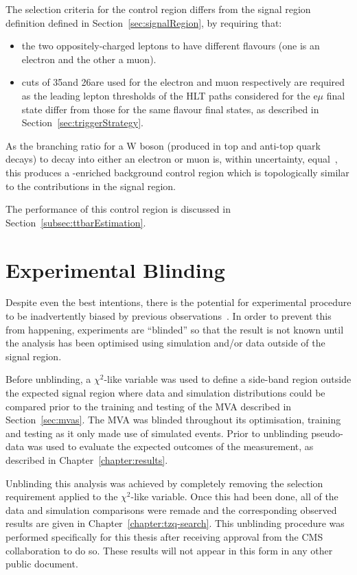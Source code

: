 The selection criteria for the \ttbar control region differs from the signal region definition defined in Section~\ref{sec:signalRegion}, by requiring that:
\begin{itemize}
\item the two oppositely-charged leptons to have different flavours (\ie one is an electron and the other a muon).
\item \pt cuts of 35\GeV and 26\GeV are used for the electron and muon respectively are required as the leading lepton \pt thresholds of the HLT paths considered for the e$\mu$ final state differ from those for the same flavour final states, as described in Section~\ref{sec:triggerStrategy}. 
\end{itemize} 

As the branching ratio for a W boson (produced in top and anti-top quark decays) to decay into either an electron or muon is, within uncertainty, equal~\cite{Tanabashi:2018oca}, this produces a \ttbar-enriched background control region which is topologically similar to the \ttbar contributions in the signal region. 

The performance of this control region is discussed in Section~\ref{subsec:ttbarEstimation}.

\section{Experimental Blinding}\label{sec:blinding}
Despite even the best intentions, there is the potential for experimental procedure to be inadvertently biased by previous observations~\cite{Roodman:2003rw}.
In order to prevent this from happening, experiments are ``blinded'' so that the result is not known until the analysis has been optimised using simulation and/or data outside of the signal region.

Before unblinding, a $\chi^{2}$-like variable was used to define a side-band region outside the expected signal region where data and simulation distributions could be compared prior to the training and testing of the MVA described in Section~\ref{sec:mvas}.
The MVA was blinded throughout its optimisation, training and testing as it only made use of simulated events.
Prior to unblinding pseudo-data was used to evaluate the expected outcomes of the measurement, as described in Chapter~\ref{chapter:results}.

Unblinding this analysis was achieved by completely removing the selection requirement applied to the $\chi^{2}$-like variable.
Once this had been done, all of the data and simulation comparisons were remade and the corresponding observed results are given in Chapter~\ref{chapter:tzq-search}.
This unblinding procedure was performed specifically for this thesis after receiving approval from the CMS collaboration to do so.
These results will not appear in this form in any other public document.

